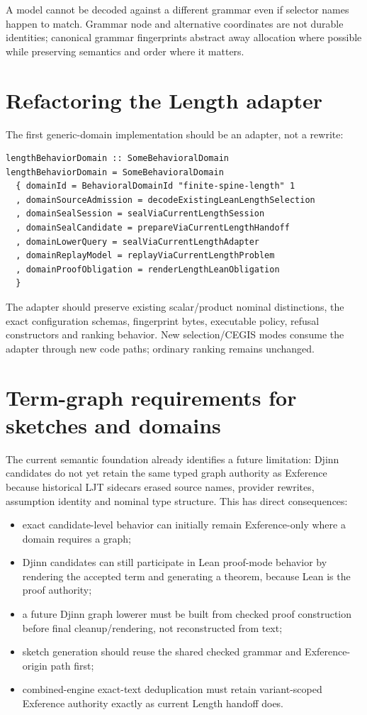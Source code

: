 \documentclass[11pt,oneside]{report}
\begin{document}
A model cannot be decoded against a different grammar even if selector names happen to match. Grammar node and alternative coordinates are not durable identities; canonical grammar fingerprints abstract away allocation where possible while preserving semantics and order where it matters.

\section{Refactoring the Length adapter}

The first generic-domain implementation should be an adapter, not a rewrite:

\begin{lstlisting}[language=HaskellX,caption={Conceptual adapter over the current Length implementation.}]
lengthBehaviorDomain :: SomeBehavioralDomain
lengthBehaviorDomain = SomeBehavioralDomain
  { domainId = BehavioralDomainId "finite-spine-length" 1
  , domainSourceAdmission = decodeExistingLeanLengthSelection
  , domainSealSession = sealViaCurrentLengthSession
  , domainSealCandidate = prepareViaCurrentLengthHandoff
  , domainLowerQuery = sealViaCurrentLengthAdapter
  , domainReplayModel = replayViaCurrentLengthProblem
  , domainProofObligation = renderLengthLeanObligation
  }
\end{lstlisting}

The adapter should preserve existing scalar/product nominal distinctions, the exact configuration schemas, fingerprint bytes, executable policy, refusal constructors and ranking behavior. New selection/CEGIS modes consume the adapter through new code paths; ordinary ranking remains unchanged.

\section{Term-graph requirements for sketches and domains}

The current semantic foundation already identifies a future limitation: Djinn candidates do not yet retain the same typed graph authority as Exference because historical LJT sidecars erased source names, provider rewrites, assumption identity and nominal type structure. This has direct consequences:

\begin{itemize}[leftmargin=2em]
\item exact candidate-level behavior can initially remain Exference-only where a domain requires a graph;
\item Djinn candidates can still participate in Lean proof-mode behavior by rendering the accepted term and generating a theorem, because Lean is the proof authority;
\item a future Djinn graph lowerer must be built from checked proof construction before final cleanup/rendering, not reconstructed from text;
\item sketch generation should reuse the shared checked grammar and Exference-origin path first;
\item combined-engine exact-text deduplication must retain variant-scoped Exference authority exactly as current Length handoff does.
\end{itemize}
\end{document}
